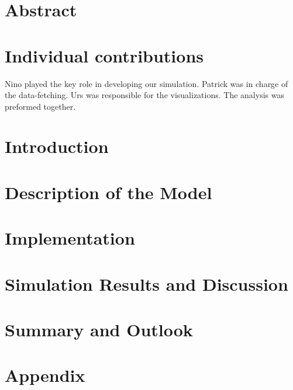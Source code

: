 \documentclass[11pt]{article}
\begin{document}



\section{Abstract}



\section{Individual contributions}


Nino played the key role in developing our simulation. Patrick was in charge of the data-fetching. Urs was responsible for the visualizations. The analysis was preformed together. 

\section{Introduction}



\section{Description of the Model}




\section{Implementation}






\section{Simulation Results and Discussion}



\section{Summary and Outlook}



\section{Appendix}


%
\end{document}
